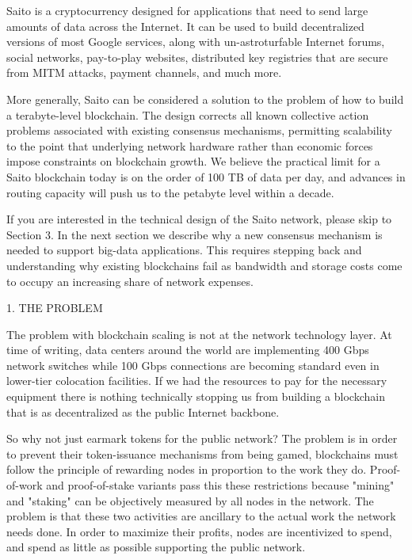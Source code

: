 \documentclass[11.5pt, oneside]{article}   	%
\begin{document}
\begin{multicols}{2}
Saito is a cryptocurrency designed for applications that need to send large amounts of data across the Internet. It can be used to build decentralized versions of most Google services, along with un-astroturfable Internet forums, social networks, pay-to-play websites, distributed key registries that are secure from MITM attacks, payment channels, and much more.

More generally, Saito can be considered a solution to the problem of how to build a terabyte-level blockchain. The design corrects all known collective action problems associated with existing consensus mechanisms, permitting scalability to the point that underlying network hardware rather than economic forces impose constraints on blockchain growth. We believe the practical limit for a Saito blockchain today is on the order of 100 TB of data per day, and advances in routing capacity will push us to the petabyte level within a decade.

If you are interested in the technical design of the Saito network, please skip to Section 3. In the next section we describe why a new consensus mechanism is needed to support big-data applications. This requires stepping back and understanding why existing blockchains fail as bandwidth and storage costs come to occupy an increasing share of network expenses.


1. THE PROBLEM

The problem with blockchain scaling is not at the network technology layer. At time of writing, data centers around the world are implementing 400 Gbps network switches while 100 Gbps connections are becoming standard even in lower-tier colocation facilities. If we had the resources to pay for the necessary equipment there is nothing technically stopping us from building a blockchain that is as decentralized as the public Internet backbone.

So why not just earmark tokens for the public network? The problem is in order to prevent their token-issuance mechanisms from being gamed, blockchains must follow the principle of rewarding nodes in proportion to the work they do. Proof-of-work and proof-of-stake variants pass this these restrictions because "mining" and "staking" can be objectively measured by all nodes in the network. The problem is that these two activities are ancillary to the actual work the network needs done. In order to maximize their profits, nodes are incentivized to spend, and spend as little as possible supporting the public network.
  

\end{multicols}
\end{document}
